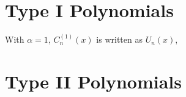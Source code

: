 \documentclass[12pt,a4paper]{article}
\begin{document}
\section{Type I Polynomials}
With $\alpha = 1$, $C^{(1)}_n(x)$ is written as $U_n(x)$, 





\section{Type II Polynomials}







































\end{document}
